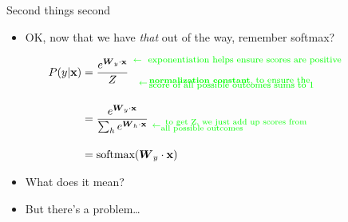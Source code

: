 \documentclass[xcolor=pdftex,x11names,table,hyperref]{beamer}
\begin{document}
\begin{frame}{Second things second}

  \begin{itemize}
  \item OK, now that we have {\it that} out of the way, remember softmax?
  \end{itemize}
  \begin{align}
    P(y | \mathbf{x}) & = \frac{{\mathnormal e}^{\boldsymbol W_y \cdot \mathbf{x}} }{Z} \hspace*{0.4em} \substack{\color{green}{ \leftarrow \, \text{\parbox[c]{0.58\textwidth}{ {\footnotesize \, exponentiation helps ensure scores are positive}}}} \\[1.0em]  \color{green}{ \leftarrow \, \text{\parbox[c]{0.55\textwidth}{ \textbf{normalization constant}, {\footnotesize to ensure the \\[-0.9em] score of all possible outcomes sums to 1}}}}}  \nonumber\\[1.0em]
                      & =     \frac{{\mathnormal e}^{\boldsymbol W_y \cdot \mathbf{x}}}{\sum_h {\mathnormal e}^{\boldsymbol W_h \cdot \mathbf{x}}}  \,\, \substack{ \, \\[1.0em]  \color{green}{ \leftarrow \text{\parbox[c]{0.50\textwidth}{ \, to get Z, we just add up scores from \\[-0.8em] all possible outcomes}}}} \nonumber\\[1.0em]
                      & = \text{softmax}(\boldsymbol W_y \cdot \mathbf{x}) \nonumber%
  \end{align}\pause
  \begin{itemize}
  \item What does it mean?\pause
  \item But there's a problem\ldots
  \end{itemize}        
\end{frame}

\end{document}
